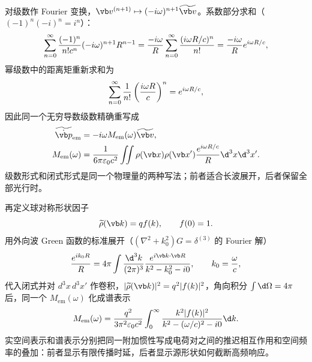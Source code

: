 对级数作 Fourier 变换，$\vb v^{(n+1)}\mapsto(-i\omega)^{n+1}\widetilde{\vb v}$。系数部分求和（$(-1)^n(-i)^n=i^n$）：
\begin{equation*}
 \sum_{n=0}^\infty{(-1)^n\over n!c^n}(-i\omega)^{n+1}R^{n-1}
 ={-i\omega\over R}\sum_{n=0}^\infty{(i\omega R/c)^n\over n!}
 ={-i\omega\over R}e^{i\omega R/c},
\end{equation*}
幂级数中的距离矩重新求和为
\begin{equation*}
 \sum_{n=0}^\infty{1\over n!}
 \left({i\omega R\over c}\right)^n
 ={e^{i\omega R/c}},
\end{equation*}
因此同一个无穷导数级数精确重写成
\begin{align*}
 \widetilde{\dot{\vb p}}_{\mathrm{em}}
 &=-i\omega M_{\mathrm{em}}(\omega)\widetilde{\vb v},\\
 M_{\mathrm{em}}(\omega)
 &={1\over6\pi\varepsilon_0c^2}
 \iint\rho(\vb x)\rho(\vb x')
 {e^{i\omega R/c}\over R}\d^3x\d^3x'.
\end{align*}
级数形式和闭式形式是同一个物理量的两种写法；前者适合长波展开，后者保留全部光行时。

再定义球对称形状因子
\begin{equation*}
 \widetilde\rho(\vb k)=qf(k),
 \qquad f(0)=1.
\end{equation*}
用外向波 Green 函数的标准展开（$(\nabla^2+k_0^2)G=\delta^{(3)}$ 的 Fourier 解）
\begin{equation*}
 {e^{ik_0R}\over R}
 =4\pi\int{\d^3k\over(2\pi)^3}{e^{i\vb k\cdot\vb R}\over k^2-k_0^2-i0},
 \qquad k_0={\omega\over c},
\end{equation*}
代入闭式并对 $d^3x\,d^3x'$ 作卷积，$|\widetilde\rho(\vb k)|^2=q^2|f(k)|^2$，角向积分 $\int\d\Omega=4\pi$ 后，同一个 $M_{\mathrm{em}}(\omega)$ 化成谱表示
\begin{equation*}
 M_{\mathrm{em}}(\omega)
 ={q^2\over3\pi^2\varepsilon_0c^2}
 \int_0^\infty
 {k^2|f(k)|^2\over k^2-(\omega/c)^2-i0}\d k.
\end{equation*}
实空间表示和谱表示分别把同一附加惯性写成电荷对之间的推迟相互作用和空间频率的叠加：前者显示有限传播时延，后者显示源形状如何截断高频响应。

